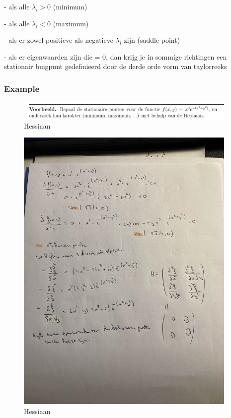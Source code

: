 \documentclass[a4paper]{article}
\begin{document}
- als alle $\lambda_i > 0$ (minimum)

- als alle $\lambda_i < 0$ (maximum)

- als er zowel positieve als negatieve $\lambda_i$ zijn (saddle point)

- als er eigenwaarden zijn die = 0, dan krijg je in sommige richtingen een stationair buigpunt gedefinieerd door de derde orde vorm van taylorreeks

\subsubsection{Example}

\begin{figure}[H]
	\begin{center}
		\includegraphics[width=0.95\textwidth]{./images/hessian_ex.png}
	\end{center}
	\caption{Hessiaan}
	\label{}
\end{figure}

\begin{figure}[H]
	\begin{center}
		\includegraphics[width=0.95\textwidth]{./images/hessian_my.jpg}
	\end{center}
	\caption{Hessiaan}
	\label{}
\end{figure}
\end{document}
